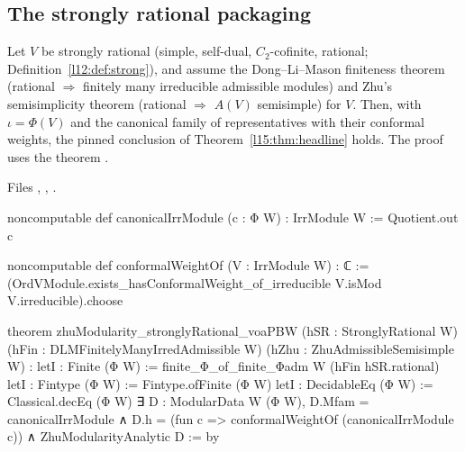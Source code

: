 \subsection{The strongly rational packaging}

\begin{theorem}\label{l15:thm:sr}
Let $V$ be strongly rational (simple, self-dual, $C_2$-cofinite, rational; Definition~\ref{l12:def:strong}), and assume
the Dong--Li--Mason finiteness theorem (rational $\Rightarrow$ finitely many irreducible admissible modules) and Zhu's
semisimplicity theorem (rational $\Rightarrow$ $A(V)$ semisimple) for $V$. Then, with $\iota=\Phi(V)$ and the canonical
family of representatives with their conformal weights, the pinned conclusion of Theorem~\ref{l15:thm:headline} holds. The
proof uses the theorem .
\end{theorem}
\noindent Files ,
, .
\begin{leancode}
noncomputable def canonicalIrrModule (c : Φ W) : IrrModule W := Quotient.out c

noncomputable def conformalWeightOf (V : IrrModule W) : ℂ :=
  (OrdVModule.exists_hasConformalWeight_of_irreducible V.isMod V.irreducible).choose

theorem zhuModularity_stronglyRational_voaPBW
    (hSR : StronglyRational W)
    (hFin : DLMFinitelyManyIrredAdmissible W)
    (hZhu : ZhuAdmissibleSemisimple W) :
    letI : Finite (Φ W) := finite_Φ_of_finite_Φadm W (hFin hSR.rational)
    letI : Fintype (Φ W) := Fintype.ofFinite (Φ W)
    letI : DecidableEq (Φ W) := Classical.decEq (Φ W)
    ∃ D : ModularData W (Φ W),
      D.Mfam = canonicalIrrModule ∧
      D.h = (fun c => conformalWeightOf (canonicalIrrModule c)) ∧
      ZhuModularityAnalytic D := by
\end{leancode}

